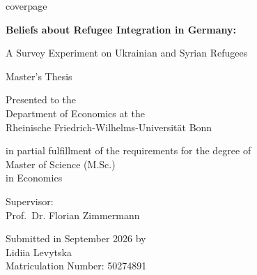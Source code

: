 \begin{titlepage}

\thispagestyle{empty}

{coverpage}

\begin{center}

\Large

\null\vfill

{\fontsize{27.5pt}{32pt}\selectfont\bfseries
Beliefs about Refugee Integration in Germany:\par
A Survey Experiment on Ukrainian and Syrian Refugees
\par}

\vfill\vfill

{\huge Master's Thesis\par}

\vspace{1.75\baselineskip}

Presented to the \\
Department of Economics at the \\
Rheinische Friedrich-Wilhelms-Universit\"at Bonn

\vspace{1.25\baselineskip}

in partial fulfillment of the requirements for the degree of \\[\baselineskip]

Master of Science (M.Sc.) \\
in Economics

\vfill\vfill

Supervisor: \\
Prof.~Dr. Florian Zimmermann

\vfill\vfill

Submitted in September 2026 by \\[1.5\baselineskip]

{\LARGE Lidiia Levytska} \\[1.5\baselineskip]

Matriculation Number: 50274891

\vfill

\end{center}

\end{titlepage}